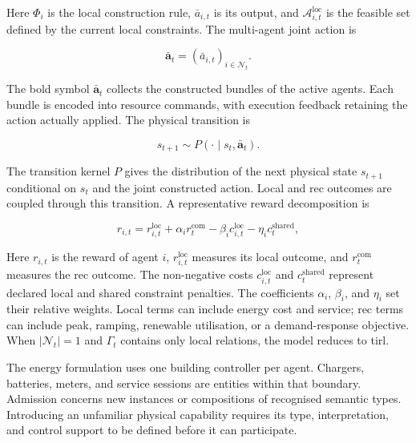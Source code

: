Here $\Phi_i$ is the local construction rule, $\bar a_{i,t}$ is its output, and $\mathcal A^{\mathrm{loc}}_{i,t}$ is the feasible set defined by the current local constraints. The multi-agent joint action is

\begin{equation}
\bar{\mathbf{a}}_t
=
\left(
\bar{a}_{i,t}
\right)_{i\in\mathcal{N}_t}.
\label{eq:joint-action}
\end{equation}

The bold symbol $\bar{\mathbf a}_t$ collects the constructed bundles of the active agents. Each bundle is encoded into resource commands, with execution feedback retaining the action actually applied. The physical transition is

\begin{equation}
s_{t+1}
\sim
P
\left(
\cdot\mid s_t,\bar{\mathbf{a}}_t
\right).
\label{eq:timg-transition}
\end{equation}

The transition kernel $P$ gives the distribution of the next physical state $s_{t+1}$ conditional on $s_t$ and the joint constructed action. Local and \gls{rec} outcomes are coupled through this transition. A representative reward decomposition is

\begin{equation}
r_{i,t}
=
r^{\mathrm{loc}}_{i,t}
+
\alpha_i r^{\mathrm{com}}_t
-
\beta_i c^{\mathrm{loc}}_{i,t}
-
\eta_i c^{\mathrm{shared}}_t,
\label{eq:timarl-reward}
\end{equation}

Here $r_{i,t}$ is the reward of agent $i$, $r^{\mathrm{loc}}_{i,t}$ measures its local outcome, and $r^{\mathrm{com}}_t$ measures the \gls{rec} outcome. The non-negative costs $c^{\mathrm{loc}}_{i,t}$ and $c^{\mathrm{shared}}_t$ represent declared local and shared constraint penalties. The coefficients $\alpha_i$, $\beta_i$, and $\eta_i$ set their relative weights. Local terms can include energy cost and service; \gls{rec} terms can include peak, ramping, renewable utilisation, or a demand-response objective. When $|\mathcal{N}_t|=1$ and $\Gamma_t$ contains only local relations, the model reduces to \gls{tirl}.

The energy formulation uses one building controller per agent. Chargers, batteries, meters, and service sessions are entities within that boundary. Admission concerns new instances or compositions of recognised semantic types. Introducing an unfamiliar physical capability requires its type, interpretation, and control support to be defined before it can participate.

